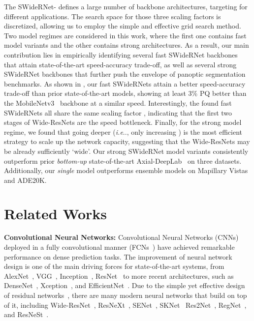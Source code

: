 \documentclass[final]{cvpr}
\makeatletter
\DeclareRobustCommand\onedot{\futurelet\@let@token\@onedot}
\def\@onedot{\ifx\@let@token.\else.\null\fi\xspace}
\def\ie{\emph{i.e}\onedot} \def\Ie{\emph{I.e}\onedot}
\makeatother
\begin{document}
The SWideRNet- defines a large number of backbone architectures, targeting for different applications. The search space for those three scaling factors is discretized, allowing us to employ the simple and effective grid search method. Two model regimes are considered in this work, where the first one contains fast model variants and the other contains strong architectures. As a result, our main contribution lies in empirically identifying several fast SWideRNet backbones that attain state-of-the-art speed-accuracy trade-off, as well as several strong SWideRNet backbones that further push the envelope of panoptic segmentation benchmarks. As shown in , our fast SWideRNets attain a better speed-accuracy trade-off than prior state-of-the-art models, showing at least 3\% PQ better than the MobileNetv3~\cite{howard2019searching} backbone at a similar speed. Interestingly, the found fast SWideRNets all share the same scaling factor , indicating that the first two stages of Wide-ResNets are the speed bottleneck.
Finally, for the strong model regime, we found that going deeper (\ie, only increasing ) is the most efficient strategy to scale up the network capacity, suggesting that the Wide-ResNets may be already sufficiently `wide'. 
Our strong SWideRNet model variants consistently outperform prior {\it bottom-up} state-of-the-art Axial-DeepLab~\cite{wang2020axial} on three datasets.
Additionally, our {\it single} model outperforms ensemble models on Mapillary Vistas and ADE20K.
 \section{Related Works}
\label{sec:related}

{\bf Convolutional Neural Networks:} 
Convolutional Neural Networks (CNNs)~\cite{lecun1998gradient} deployed in a fully convolutional manner (FCNs~\cite{sermanet2014overfeat,long2015fully}) have achieved remarkable performance on dense prediction tasks. The improvement of neural network design is one of the main driving forces for state-of-the-art systems, from AlexNet~\cite{krizhevsky2012imagenet}, VGG~\cite{simonyan2014very}, Inception~\cite{ioffe2015batch,szegedy2016rethinking,szegedy2017inception}, ResNet~\cite{he2016deep,he2016identity} to more recent architectures, such as  DenseNet~\cite{huang2017densely}, Xception~\cite{chollet2017xception, dai2017coco}, and EfficientNet~\cite{tan2019efficientnet}. Due to the simple yet effective design of residual networks~\cite{he2016deep}, there are many modern neural networks that build on top of it, including Wide-ResNet~\cite{wrn2016wide,wu2019wider}, ResNeXt~\cite{xie2017aggregated}, 
SENet~\cite{hu2018squeeze}, SKNet~\cite{li2019selective}
Res2Net~\cite{gao2019res2net}, RegNet~\cite{radosavovic2020designing}, and ResNeSt~\cite{zhang2020resnest}. 
\end{document}
